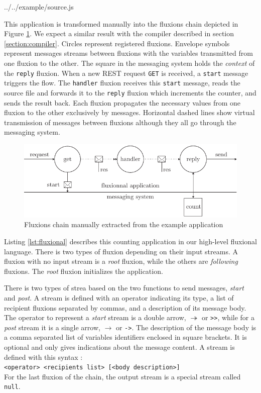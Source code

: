{../../example/source.js}

This application is transformed manually into the fluxions chain depicted in Figure \ref{fig:fluxions}.
We expect a similar result with the compiler described in section \ref{section:compiler}.
Circles represent registered fluxions.
Envelope symbols represent messages streams between fluxions with the variables transmitted from one fluxion to the other.
The square in the messaging system holds the \textit{context} of the \texttt{reply} fluxion.
When a new REST request \texttt{GET} is received, a \texttt{start} message triggers the flow.
The \texttt{handler} fluxion receives this \texttt{start} message, reads the source file and forwards it to the \texttt{reply} fluxion which increments the counter, and sends the result back.
Each fluxion propagates the necessary values from one fluxion to the other exclusively by messages.
Horizontal dashed lines show virtual transmission of messages between fluxions although they all go through the messaging system.

\begin{figure}[h!]
  \includegraphics[width=\linewidth]{ressources/flux.pdf}
  \caption{Fluxions chain manually extracted from the example application}
  \label{fig:fluxions}
\end{figure}

Listing \ref{lst:fluxional} describes this counting application in our high-level fluxional language.
There is two types of fluxion depending on their input streams.
A fluxion with no input stream is a \textit{root} fluxion, while the others are \textit{following} fluxions.
The \textit{root} fluxion initializes the application.

There is two types of strea based on the two functions to send messages, \textit{start} and \textit{post}.
A stream is defined with an operator indicating its type, a list of recipient fluxions separated by commas, and a description of its message body. 
The operator to represent a \textit{start} stream is a double arrow, $\twoheadrightarrow$ or \texttt{>}\texttt{>}, while for a \textit{post} stream it is a single arrow, $\rightarrow$ or \texttt{->}.
The description of the message body is a comma separated list of variables identifiers enclosed in square brackets.
It is optional and only gives indications about the message content.
A stream is defined with this syntax :\\
\texttt{<operator> <recipients list> [<body description>]}\\
For the last fluxion of the chain, the output stream is a special stream called \texttt{null}.

